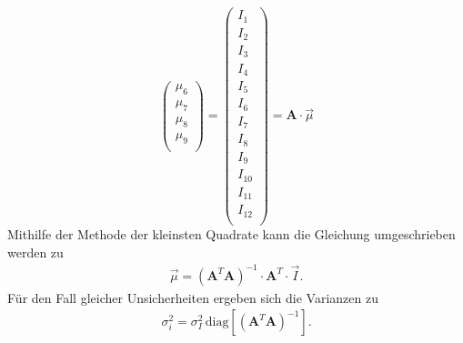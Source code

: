 \begin{equation}
\begin{pmatrix}
                \mu_6\\
                \mu_7\\
                \mu_8\\
                \mu_9\\
             \end{pmatrix}
             =
             \begin{pmatrix}
                I_1\\
                I_2\\
                I_3\\
                I_4\\
                I_5\\
                I_6\\
                I_7\\
                I_8\\
                I_9\\
                I_{10}\\
                I_{11}\\
                I_{12}\\
             \end{pmatrix}
             =  \textbf{A} \cdot \vec{\mu}
        \end{equation}
        Mithilfe der Methode der kleinsten Quadrate 
        kann die Gleichung umgeschrieben werden zu 
        \begin{align*}
            \vec{\mu} = (\textbf{A}^T\textbf{A})^{-1}\cdot\textbf{A}^T\cdot\vec{I}.
        \end{align*}
        Für den Fall gleicher Unsicherheiten ergeben sich die Varianzen zu 
        \begin{align*}
            \sigma_i^2 = \sigma_I^2\,\text{diag}[(\textbf{A}^{T}\textbf{A})^{-1}].
        \end{align*}